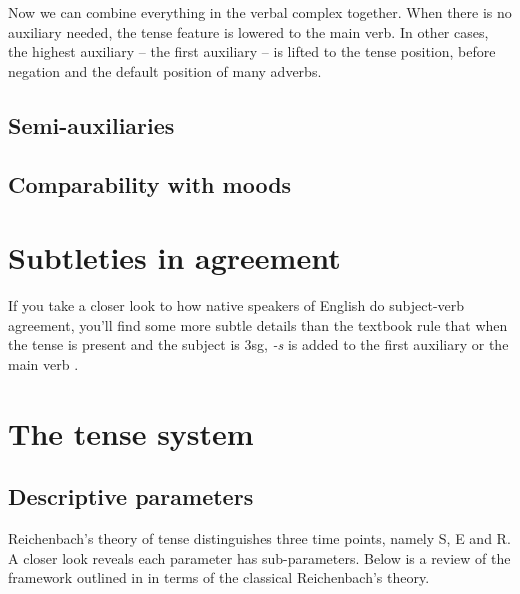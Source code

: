 \documentclass[UTF8, a4paper, oneside, scheme=plain]{ctexrep}
\newcommand*{\citesec}[1]{\S~{#1}}
\newcommand*{\citechap}[1]{Ch~{#1}}
\newcommand*{\citepages}[1]{pp.~{#1}}
\newcommand{\corpus}[1]{\emph{#1}}
\begin{document}
Now we can combine everything in the verbal complex together.
When there is no auxiliary needed,
the tense feature is lowered to the main verb. 
In other cases, the highest auxiliary -- the first auxiliary -- 
is lifted to the tense position,
before negation and the default position of many adverbs.

\subsection{Semi-auxiliaries}\label{sec:semi-auxiliary}

\subsection{Comparability with moods}\label{sec:tam-mood-compatibility}

\section{Subtleties in agreement}\label{sec:verb-inflection.agreement}

If you take a closer look to how native speakers of English do subject-verb agreement,
you'll find some more subtle details than 
the textbook rule that when the tense is \acl{present}
and the subject is 3sg, 
\corpus{-s} is added to the first auxiliary or the main verb
\citep[\citechap{5}, \citesec{18}]{cgel}.

\section{The tense system}

\subsection{Descriptive parameters}

Reichenbach's theory of tense distinguishes three time points, namely S, E and R.
A closer look reveals each parameter has sub-parameters.
Below is a review of the framework outlined in 
\citet[\citepages{125-126}]{cgel}
in terms of the classical Reichenbach's theory.
\end{document}
